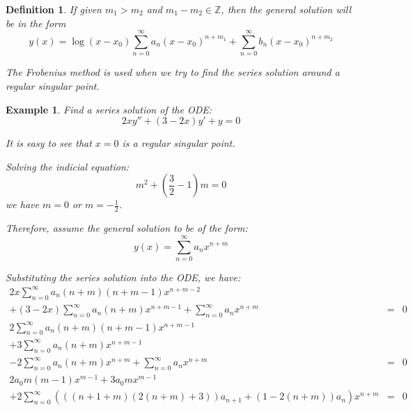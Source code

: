 \documentclass{article}
\newtheorem{definition}{Definition}[section]
\newtheorem{example}{Example}[section]
\begin{document}
\begin{enumerate}
\begin{definition}
              If given $m_{1} > m_{2} $ and $m_{1} - m_{2} \in \mathbb{Z}$,
              then the general solution will be in the form
              \begin{equation}
                  y(x) = \log(x-x_{0}) \sum_{n=0}^{\infty} a_n (x - x_0)^{n+m_{1}}
                  + \sum_{n=0}^{\infty} b_n (x - x_0)^{n+m_{2}}
              \end{equation}

              The Frobenius method is used when we try to find the series solution
              around a regular singular point.
          \end{definition}
          \begin{example}
              Find a series solution of the ODE:
              \begin{equation}
                  2x y'' + (3-2x) y' + y = 0
              \end{equation}

              It is easy to see that $x = 0$ is a regular singular point.

              Solving the indicial equation:
              \begin{equation}
                  m^2 + (\frac{3}{2}-1) m = 0
              \end{equation}
              we have $m = 0$ or $m = -\frac{1}{2}$.

              Therefore, assume the general solution to be of the form:
              \begin{equation}
                  y(x) = \sum_{n=0}^{\infty} a_n x^{n+m}
              \end{equation}

              Substituting the series solution into the ODE,
              we have:
              \begin{eqnarray}
                  2x \sum_{n=0}^{\infty} a_n (n+m)(n+m-1) x^{n+m-2} && \\
                  + (3-2x) \sum_{n=0}^{\infty} a_n (n+m) x^{n+m-1}
                  + \sum_{n=0}^{\infty} a_n x^{n+m}
                  &=& 0 \\
                  2 \sum_{n=0}^{\infty} a_n (n+m)(n+m-1) x^{n+m-1} && \\
                  + 3 \sum_{n=0}^{\infty} a_n (n+m) x^{n+m-1} && \\
                  - 2 \sum_{n=0}^{\infty} a_n (n+m) x^{n+m}
                  + \sum_{n=0}^{\infty} a_n x^{n+m}
                  &=& 0 \\
                  2a_{0} m (m-1) x^{m-1} + 3a_{0} m x^{m-1} && \\
                  + 2 \sum_{n=0}^{\infty} \left(
                  \left(
                  (n + 1 + m)(2(n + m) + 3)
                  \right) a_{n + 1}
                  + \left(
                  1 - 2(n + m)
                  \right) a_{n} \right) x^{n+m}
                  &=& 0
              \end{eqnarray}


\end{example}
\end{enumerate}
\end{document}
